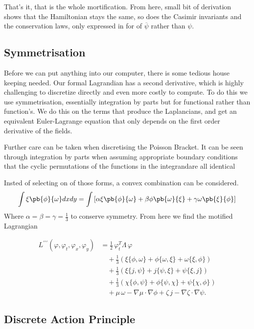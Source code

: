 That's it, that is the whole mortification. From here, small bit of derivation shows that the Hamiltonian stays the same, so does the Casimir invariants and the conservation laws, only expressed in for of $\overline{\psi}$ rather than $\psi$.

\subsection{Symmetrisation}

Before we can put anything into our computer, there is some tedious house keeping needed. Our formal Lagrandian has a second derivative, which is highly challenging to discretize directly and even more costly to compute. To do this we use symmetrisation, essentially integration by parts but for functional rather than function's. We do this on the terms that produce the Laplancians, and get an equivalent Euler-Lagrange equation that only depends on the first order derivative of the fields.


Further care can be taken when discretising the Poisson Bracket. It can be seen through integration by parts when assuming appropriate boundary conditions that the cyclic permutations of the functions in the integrandare all identical

Insted of selecting on of those forms, a convex combination can be considered.
\[
\int \xi \pb{\phi}{\omega} dx dy = \int \left[\alpha \xi \pb{\phi}{\omega} + \beta \phi \pb{\omega}{\xi} + \gamma \omega \pb{\xi}{\phi}   \right]
  \]
  Where $\alpha = \beta = \gamma = \frac{1}{3}$ to conserve symmetry. From here we find the motified Lagrangian

\begin{align}
L^{\prime\prime\prime}(\varphi, \varphi_t, \varphi_x, \varphi_y)
&= \frac{1}{2}\,\varphi_t^{T}\Lambda\,\varphi \\
&\quad + \frac{1}{3}\left(
    \xi\{\phi,\omega\} + \phi\{\omega,\xi\} + \omega\{\xi,\phi\}
\right) \\
&\quad + \frac{1}{3}\left(
    \xi\{j,\psi\} + j\{\psi,\xi\} + \psi\{\xi,j\}
\right) \\
&\quad + \frac{1}{3}\left(
    \chi\{\phi,\psi\} + \phi\{\psi,\chi\} + \psi\{\chi,\phi\}
\right) \\
&\quad + \mu\,\omega - \nabla\mu\cdot\nabla\phi
      + \zeta\,j - \nabla\zeta\cdot\nabla\psi .
\end{align}


\subsection{Discrete Action Principle}

